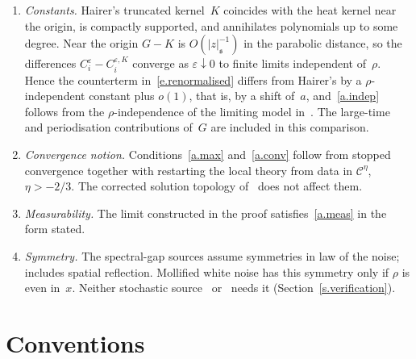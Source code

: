 \documentclass[11pt,letterpaper]{article}
\numberwithin{equation}{section}
\theoremstyle{plain}
\theoremstyle{definition}
\theoremstyle{remark}
\newcommand{\Cs}{\mathcal{C}}
\newcommand{\nf}[2]{#1/#2}
\newcommand{\1}{\mathbf{1}}
\begin{document}
\begin{enumerate}[label=\textup{(V\arabic*)}]
\item \label{v.constants} \emph{Constants.} Hairer's truncated kernel~$K$ coincides with the heat kernel near the origin, is compactly supported, and annihilates polynomials up to some degree. Near the origin $G-K$ is $O(|z|_{\mathfrak s}^{-1})$ in the parabolic distance, so the differences $C_i^\varepsilon-C_i^{\varepsilon,K}$ converge as $\varepsilon\downarrow0$ to finite limits independent of~$\rho$. Hence the counterterm in~\eqref{e.renormalised} differs from Hairer's by a $\rho$-independent constant plus $o(1)$, that is, by a shift of~$a$, and~\ref{a.indep} follows from the $\rho$-independence of the limiting model in~\cite[Theorem~10.22]{Hai14}. The large-time and periodisation contributions of~$G$ are included in this comparison.
\item \label{v.topology} \emph{Convergence notion.} Conditions~\ref{a.max} and~\ref{a.conv} follow from stopped convergence together with restarting the local theory from data in $\Cs^\eta$, $\eta>-\nf{2}{3}$. The corrected solution topology of~\cite{BCCH21} does not affect them.
\item \label{v.meas} \emph{Measurability.} The limit constructed in the proof satisfies~\ref{a.meas} in the form stated.
\item \label{v.symmetry} \emph{Symmetry.} The spectral-gap sources assume symmetries in law of the noise; \cite[(6)--(8)]{BOT25} includes spatial reflection. Mollified white noise has this symmetry only if $\rho$ is even in~$x$. Neither stochastic source~\cite{HS23} or~\cite{BH26} needs it (Section~\ref{s.verification}).
\end{enumerate}

\section{Conventions}
\label{s.decisions}
\end{document}
